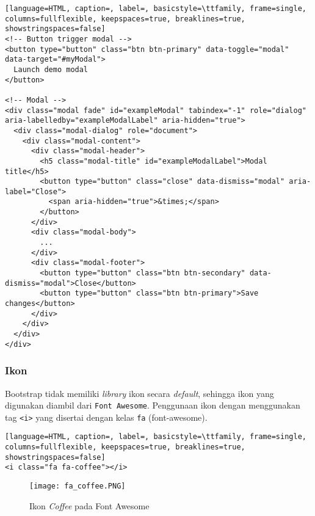 \begin{lstlisting}[language=HTML, caption=, label=, basicstyle=\ttfamily, frame=single, columns=fullflexible, keepspaces=true, breaklines=true, showstringspaces=false] 
<!-- Button trigger modal -->
<button type="button" class="btn btn-primary" data-toggle="modal" data-target="#myModal">
  Launch demo modal
</button>

<!-- Modal -->
<div class="modal fade" id="exampleModal" tabindex="-1" role="dialog" 
aria-labelledby="exampleModalLabel" aria-hidden="true">
  <div class="modal-dialog" role="document">
    <div class="modal-content">
      <div class="modal-header">
        <h5 class="modal-title" id="exampleModalLabel">Modal title</h5>
        <button type="button" class="close" data-dismiss="modal" aria-label="Close">
          <span aria-hidden="true">&times;</span>
        </button>
      </div>
      <div class="modal-body">
        ...
      </div>
      <div class="modal-footer">
        <button type="button" class="btn btn-secondary" data-dismiss="modal">Close</button>
        <button type="button" class="btn btn-primary">Save changes</button>
      </div>
    </div>
  </div>
</div>
\end{lstlisting}

\subsubsection{Ikon}
Bootstrap tidak memiliki \textit{library} ikon secara \textit{default}, sehingga ikon yang digunakan diambil dari \texttt{Font Awesome}. Penggunaan ikon dengan menggunakan tag \texttt{<i>} yang disertai dengan kelas \texttt{fa} (font-awesome). 

\begin{lstlisting}[language=HTML, caption=, label=, basicstyle=\ttfamily, frame=single, columns=fullflexible, keepspaces=true, breaklines=true, showstringspaces=false]
<i class="fa fa-coffee"></i>
\end{lstlisting}

\begin{figure} [H]
	\centering  
	\texttt{[image: fa\_coffee.PNG]}  
	\caption{Ikon \textit{Coffee} pada Font Awesome} 
\end{figure}
